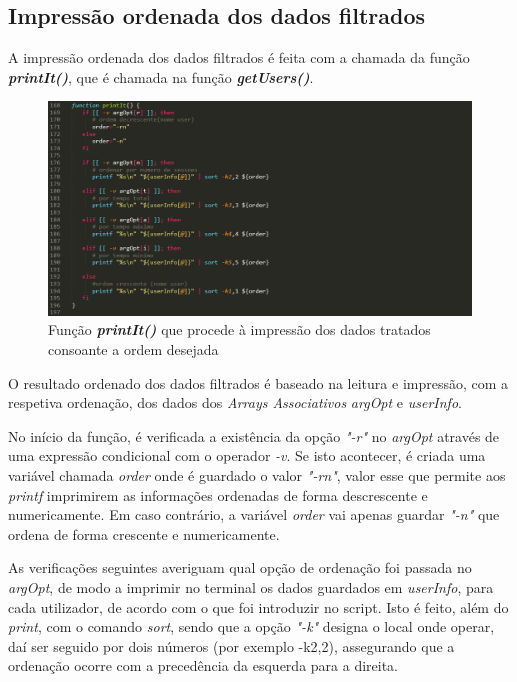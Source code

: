 \documentclass[10pt,portuguese]{article}
\begin{document}
\subsection{Impressão ordenada dos dados filtrados}
\par A impressão ordenada dos dados filtrados é feita com a chamada da função \textbf{\textit{printIt()}}, que é chamada na função \textbf{\textit{getUsers()}}.
\begin{figure}[!h]
    \centering
    \includegraphics[width=\textwidth]{printit.png}
    \caption{Função \textbf{\textit{printIt()}} que procede à impressão dos dados tratados consoante a ordem desejada}
\end{figure}
\par O resultado ordenado dos dados filtrados é baseado na leitura e impressão, com a respetiva ordenação, dos dados dos \textit{Arrays Associativos} \textit{argOpt} e \textit{userInfo}.
\par No início da função, é verificada a existência da opção \textit{"-r"} no \textit{argOpt} através de uma expressão condicional com o operador \textit{-v}. Se isto acontecer, é criada uma variável chamada \textit{order} onde é guardado o valor \textit{"-rn"}, valor esse que permite aos \textit{printf} imprimirem as informações ordenadas de forma descrescente e numericamente. Em caso contrário, a variável \textit{order} vai apenas guardar \textit{"-n"} que ordena de forma crescente e numericamente.
\par As verificações seguintes averiguam qual opção de ordenação foi passada no \textit{argOpt}, de modo a imprimir no terminal os dados guardados em \textit{userInfo}, para cada utilizador, de acordo com o que foi introduzir no script. Isto é feito, além do \textit{print}, com o comando \textit{sort}, sendo que a opção \textit{"-k"} designa o local onde operar, daí ser seguido por dois números (por exemplo -k2,2), assegurando que a ordenação ocorre com a precedência da esquerda para a direita.
\end{document}
